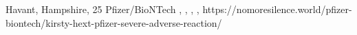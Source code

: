           {Havant, Hampshire, }
          {25}
          {Pfizer/BioNTech}
          {}
          {
            ,
            ,
            ,
            ,
          }
          {https://nomoresilence.world/pfizer-biontech/kirsty-hext-pfizer-severe-adverse-reaction/}

